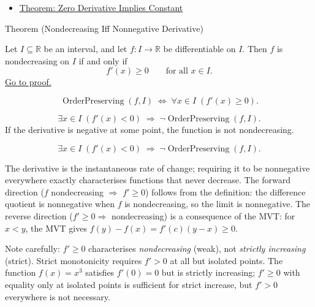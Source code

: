 \begin{dependencies}
\begin{itemize}
  \item \hyperref[thm:zero-derivative-implies-constant]{Theorem: Zero Derivative Implies Constant}
\end{itemize}
\end{dependencies}


\begin{theorembox}{Theorem (Nondecreasing Iff Nonnegative Derivative)}
\begin{theorem}
\label{thm:nondecreasing-iff-nonneg-derivative}
Let $I \subseteq \mathbb{R}$ be an interval, and let $f : I \to \mathbb{R}$ be differentiable on $I$. Then $f$ is nondecreasing on $I$ if and only if
\[
f'(x) \geq 0 \qquad \text{for all } x \in I.
\]
\hyperref[prf:nondecreasing-iff-nonneg-derivative]{Go to proof.}
\end{theorem}
\end{theorembox}

\begin{remark*}
\[
\operatorname{OrderPreserving}(f,I)
\;\iff\;
\forall x \in I\;(f'(x) \geq 0).
\]
\end{remark*}

\begin{remark*}[Interpretation]
\[
\exists x \in I\;(f'(x) < 0)
\;\Rightarrow\;
\lnot\operatorname{OrderPreserving}(f,I).
\]
If the derivative is negative at some point, the function is not nondecreasing.


\[
\exists x \in I\;(f'(x) < 0) \;\Rightarrow\; \lnot\operatorname{OrderPreserving}(f,I).
\]


The derivative is the instantaneous rate of change; requiring it to be nonnegative everywhere exactly characterises functions that never decrease. The forward direction ($f$ nondecreasing $\Rightarrow$ $f' \geq 0$) follows from the definition: the difference quotient is nonnegative when $f$ is nondecreasing, so the limit is nonnegative. The reverse direction ($f' \geq 0 \Rightarrow$ nondecreasing) is a consequence of the MVT: for $x < y$, the MVT gives $f(y)-f(x) = f'(c)(y-x) \geq 0$.

Note carefully: $f' \geq 0$ characterises \emph{nondecreasing} (weak), not \emph{strictly increasing} (strict). Strict monotonicity requires $f' > 0$ at all but isolated points. The function $f(x) = x^3$ satisfies $f'(0) = 0$ but is strictly increasing; $f' \geq 0$ with equality only at isolated points is sufficient for strict increase, but $f' > 0$ everywhere is not necessary.
\end{remark*}

